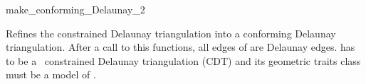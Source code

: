 \begin{ccRefFunction}{make_conforming_Delaunay_2}


{ Refines the constrained Delaunay triangulation  into a
  conforming Delaunay triangulation. After a call to this functions,
  all edges of  are Delaunay edges.  \ccPrecond {} has
  to be a \cgal\ constrained Delaunay triangulation (CDT) and its
  geometric traits class must be a model of
  .}


\end{ccRefFunction}

